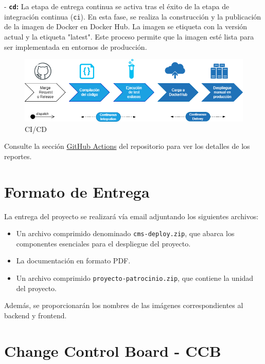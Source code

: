 - \textbf{\texttt{cd}:} La etapa de entrega continua se activa tras el éxito de la etapa de integración continua (\texttt{ci}). En esta fase, se realiza la construcción y la publicación de la imagen de Docker en Docker Hub. La imagen se etiqueta con la versión actual y la etiqueta "latest". Este proceso permite que la imagen esté lista para ser implementada en entornos de producción.



\begin{figure}[H]
    \centering
    \includegraphics[width=1\linewidth]{fig/cicd.png}
    \caption{CI/CD}
    \label{fig:ci-cd}
\end{figure}

Consulte la sección \href{https://github.com/proyecto-patrocinio/proyecto-patrocinio/actions}{GitHub Actions} del repositorio para ver los detalles de los reportes.




\section{Formato de Entrega}
La entrega del proyecto se realizará vía email adjuntando los siguientes archivos:

\begin{itemize}
    \item Un archivo comprimido denominado \texttt{cms-deploy.zip}, que abarca los componentes esenciales para el despliegue del proyecto.
    \item La documentación en formato PDF.
    \item Un archivo comprimido \texttt{proyecto-patrocinio.zip}, que contiene la unidad del proyecto.
\end{itemize}

Además, se proporcionarán los nombres de las imágenes correspondientes al backend y frontend.




\section{Change Control Board - CCB}

